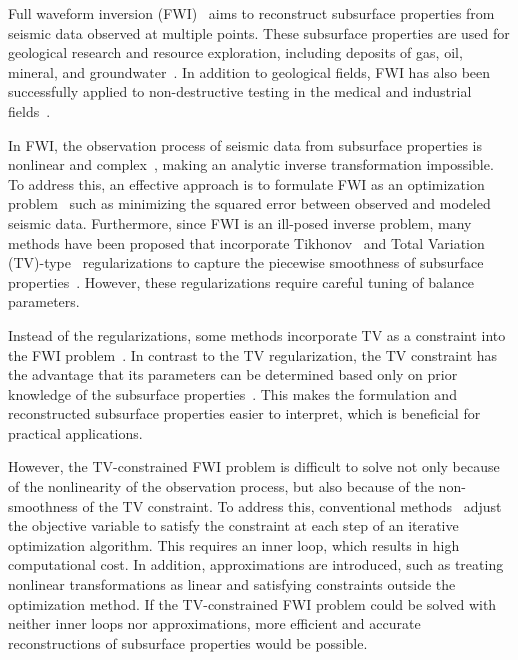 Full waveform inversion (FWI)~\cite{FWI0,FWI1} aims to reconstruct subsurface properties from seismic data observed at multiple points.
These subsurface properties are used for geological research and resource exploration, including deposits of gas, oil, mineral, and groundwater~\cite{FWI1,FWIApplicationGroundwater0,FWIApplicationGroundwater1}.
In addition to geological fields, FWI has also been successfully applied to non-destructive testing in the medical and industrial fields~\cite{FWIApplicationNonDestructiveTesting0,FWIApplicationNonDestructiveTesting1}.

In FWI, the observation process of seismic data from subsurface properties is nonlinear and complex~\cite{FWI1}, making an analytic inverse transformation impossible.
To address this, an effective approach is to formulate FWI as an optimization problem~\cite{FWI0,CustomFWI0,CustomFWI1,CustomFWI2,CustomFWI3,CustomFWI4,CustomFWI5} such as minimizing the squared error between observed and modeled seismic data.
Furthermore, since FWI is an ill-posed inverse problem, many methods have been proposed that incorporate Tikhonov~\cite{tikhonov} and Total Variation (TV)-type~\cite{TV,TGV} regularizations to capture the piecewise smoothness of subsurface properties~\cite{FWI-with-tikhonov-regularization,FWI-with-TV-regularization,FWI-with-directional-TV-regularization,FWI-with-high-order-TV-regularization,FWI-with-TGV-regularization}.
However, these regularizations require careful tuning of balance parameters.

Instead of the regularizations, some methods incorporate TV as a constraint into the FWI problem~\cite{FWI-with-TV-constraint,FWI-with-TV-constraint2,FWI-with-TV-constraint3}.
In contrast to the TV regularization, the TV constraint has the advantage that its parameters can be determined based only on prior knowledge of the subsurface properties~\cite{constraints-vs-penalties-in-FWI}.
This makes the formulation and reconstructed subsurface properties easier to interpret, which is beneficial for practical applications.

However, the TV-constrained FWI problem is difficult to solve not only because of the nonlinearity of the observation process, but also because of the non-smoothness of the TV constraint.
To address this, conventional methods~\cite{FWI-with-TV-constraint,FWI-with-TV-constraint2,FWI-with-TV-constraint3} adjust the objective variable to satisfy the constraint at each step of an iterative optimization algorithm.
This requires an inner loop, which results in high computational cost.
In addition, approximations are introduced, such as treating nonlinear transformations as linear and satisfying constraints outside the optimization method.
If the TV-constrained FWI problem could be solved with neither inner loops nor approximations, more efficient and accurate reconstructions of subsurface properties would be possible.

